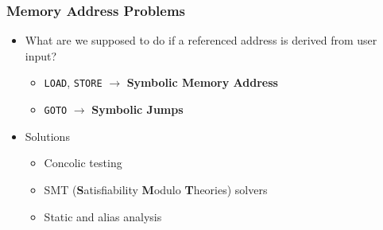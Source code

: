 \begin{frame}
	\frametitle{Memory Address Problems}
	\begin{itemize}
		\item What are we supposed to do if a referenced address is derived from user input?
		\begin{itemize}
			\item \texttt{LOAD}, \texttt{STORE} $\rightarrow$ \textbf{Symbolic Memory Address}
			\item \texttt{GOTO} $\rightarrow$ \textbf{Symbolic Jumps}
		\end{itemize}
		\item Solutions
		\begin{itemize}
			\item Concolic testing
			\item SMT (\textbf{S}atisfiability \textbf{M}odulo \textbf{T}heories) solvers
			\item Static and alias analysis
		\end{itemize}
	\end{itemize}
\end{frame}